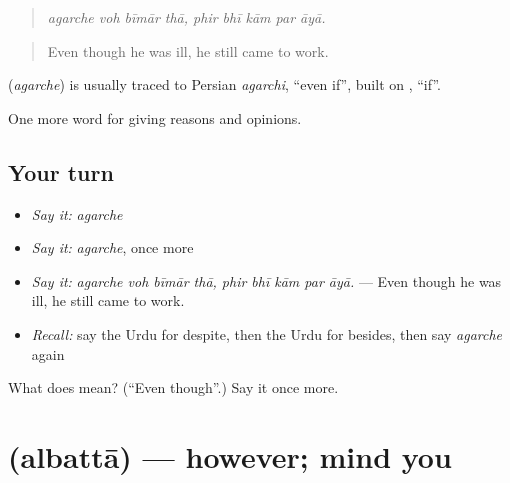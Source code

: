 \begin{quote}
        
\end{quote}

\begin{quote}
\emph{agarche voh bīmār thā, phir bhī kām par āyā.}
\end{quote}

\begin{quote}
Even though he was ill, he still came to work.
\end{quote}

\begin{cousinweb}
\textbf{} (\emph{agarche}) is usually traced to Persian \emph{agarchi}, \textquotedblleft{}even if\textquotedblright{}, built on \textbf{}, \textquotedblleft{}if\textquotedblright{}.
\end{cousinweb}

\begin{grammarlens}[title={What you've built}]
One more word for giving reasons and opinions.
\end{grammarlens}

\subsection*{Your turn}
\begin{itemize}
\raggedright
  \item \emph{Say it:} \emph{agarche}
  \item \emph{Say it:} \emph{agarche}, once more
  \item \emph{Say it:} \emph{agarche voh bīmār thā, phir bhī kām par āyā.} — Even though he was ill, he still came to work.
  \item \emph{Recall:} say the Urdu for despite, then the Urdu for besides, then say \emph{agarche} again
\end{itemize}

\begin{tcolorbox}[breakable,colback=teal!4,colframe=teal!35!black,title={Before you move on}]
What does  mean? (\textquotedblleft{}Even though\textquotedblright{}.) Say it once more.
\end{tcolorbox}
\section[\texorpdfstring{\ur{البتہ} (albattā)}{البتہ (albattā)}]{ (albattā) — however; mind you}

